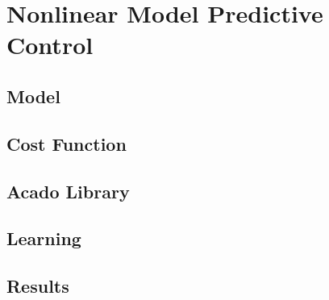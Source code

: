 \chapter{Nonlinear Model Predictive Control}\label{chap:nonlinear_mpc}


\section{Model}

\section{Cost Function}

\section{Acado Library}


\section{Learning}


\section{Results}
